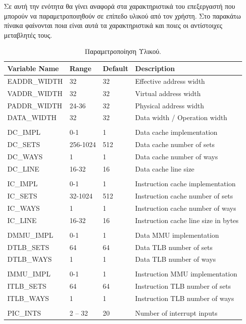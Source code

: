 \documentclass[a4paper,10pt]{article}
\numberwithin{figure}{section}
\numberwithin{table}{section}
\begin{document}
Σε αυτή την ενότητα θα γίνει αναφορά στα χαρακτηριστικά του επεξεργαστή που μπορούν να παραμετροποιηθούν σε επίπεδο υλικού από τον χρήστη.
Στο παρακάτω πίνακα φαίνονται ποια είναι αυτά τα χαρακτηριστικά και ποιες οι αντίστοιχες μεταβλητές τους.
{%
\renewcommand{\arraystretch}{1.2}
\setlength{\tabcolsep}{0.3em}
\newcommand{\mc}[3]{\multicolumn{#1}{#2}{#3}}
\begin{table}[h]
\begin{center}
\begin{tabular}{|l|l|l|l|}
\hline
\rowcolor{tcA}
Variable Name & Range & Default & Description\\\hline
EADDR\_WIDTH & 32 & 32 & Effective address width\\\hline
VADDR\_WIDTH & 32 & 32 & Virtual address width\\\hline
PADDR\_WIDTH & 24-36 & 32 & Physical address width\\\hline
DATA\_WIDTH & 32 & 32 & Data width / Operation width\\\hline
 &  &  & \\\hline
DC\_IMPL & 0-1 & 1 & Data cache implementation\\\hline
DC\_SETS & 256-1024 & 512 & Data cache number of sets\\\hline
DC\_WAYS & 1 & 1 & Data cache number of ways\\\hline
DC\_LINE & 16-32 & 16 & Data cache line size\\\hline
 &  &  & \\\hline
IC\_IMPL & 0-1 & 1 & Instruction cache implementation\\\hline
IC\_SETS & 32-1024 & 512 & Instruction cache number of sets\\\hline
IC\_WAYS & 1 & 1 & Instruction cache number of ways\\\hline
IC\_LINE & 16-32 & 16 & Instruction cache line size in bytes\\\hline
 &  &  & \\\hline
DMMU\_IMPL & 0-1 & 1 & Data MMU implementation\\\hline
DTLB\_SETS & 64 & 64 & Data TLB number of sets\\\hline
DTLB\_WAYS & 1 & 1 & Data TLB number of ways\\\hline
 &  &  & \\\hline
IMMU\_IMPL & 0-1 & 1 & Instruction MMU implementation\\\hline
ITLB\_SETS & 64 & 64 & Instruction TLB number of sets\\\hline
ITLB\_WAYS & 1 & 1 & Instruction TLB number of ways\\\hline
 &  &  & \\\hline
PIC\_INTS & 2 – 32 & 20 & Number of interrupt inputs\\\hline
\end{tabular}
\end{center}
\caption{Παραμετροποίηση Υλικού.}
\end{table}
}%
\end{document}
